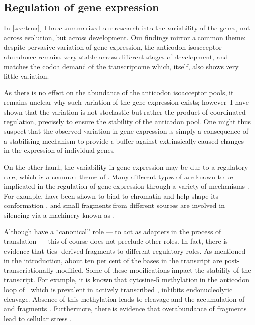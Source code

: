 \subsection{Regulation of  gene expression}

In \cref{sec:trna}, I have summarised our research into the variability of the
\trna genes, not across evolution, but across development. Our findings mirror a
common theme: despite pervasive variation of \trna gene expression, the
anticodon isoacceptor \trna abundance remains very stable across different
stages of development, and matches the codon demand of the transcriptome which,
itself, also shows very little variation.

As there is no effect on the abundance of the \trna anticodon isoacceptor pools,
it remains unclear why such variation of the \trna gene expression exists;
however, I have shown that the variation is not stochastic but rather the
product of coordinated regulation, precisely to ensure the stability of the
anticodon pool. One might thus suspect that the observed variation in \trna gene
expression is simply a consequence of a stabilising mechanism to provide a
buffer against extrinsically caused changes in the expression of individual
\trna genes.

On the other hand, the variability in \trna gene expression may be due to a
regulatory role, which is a common theme of \ncrna[s]: Many different types of
\ncrna are known to be implicated in the regulation of gene expression through a
variety of mechanisms \citep{Mattick:2006}. For example, \lncrna[s] have been
shown to bind to chromatin and help shape its conformation \citep{Rinn:2012},
and small \rna fragments from different sources are involved in \rna silencing
via a machinery known as \risc \citep{Hamilton:1999,Hammond:2000}.

Although \trna[s] have a “canonical” role — to act as adapters in the process of
translation — this of course does not preclude other roles. In fact, there is
evidence that ties \trna-derived fragments to different regulatory roles. As
mentioned in the introduction, about ten per cent of the bases in the \trna[s]
transcript are post-transcriptionally modified. Some of these modifications
impact the stability of the transcript. For example, it is known that
cytosine-\num{5} methylation in the anticodon loop of \trna[s], which is
prevalent in actively transcribed \trna[s], inhibits endonucleolytic cleavage.
Absence of this methylation leads to cleavage and the accumulation of \threep
and \fivep fragments \citep{Thompson:2008}. Furthermore, there is evidence that
overabundance of \fivep \trna fragments lead to cellular stress
\citep{Blanco:2014}.

